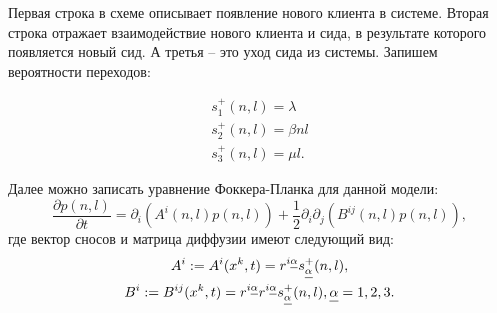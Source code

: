 \documentclass[floatfix,
showkeys,
twocolumn, nofootinbib, superscriptaddress, ]{revtex4-1}
\newcommand{\crd}[1]{\underline{\vphantom{j}{#1}}}
\begin{document}
  Первая строка в схеме описывает появление нового клиента в
  системе. Вторая строка отражает взаимодействие нового клиента и
  сида, в результате которого появляется новый сид. А третья – это
  уход сида из системы.
  Запишем вероятности переходов:

\begin{equation} 
  \label{ft:2}
  \begin{gathered}
    s^{+}_1 (n,l) = \lambda \\
    s^{+}_2 (n,l) = \beta nl \\
    s^{+}_3 (n,l) = \mu l.
  \end{gathered}
\end{equation}

  Далее можно записать уравнение Фоккера-Планка для данной модели:
\begin{equation}
  \label{ft:3} 
  \frac{\partial p(n,l)}{\partial t} = {\partial_i}
  (A^i(n,l) p(n,l)) + \frac{1}{2} {\partial_i \partial_j} (B^{ij}(n,l)
  p(n,l)),
\end{equation}
  где вектор сносов и матрица диффузии имеют следующий вид:
\begin{equation}
  \begin{gathered}
    A^i: = A^i(x^k,t)= r^{i\crd{\alpha}}s^+_{\crd{\alpha}} (n,l) ,\\
    B^i:= B^{ij}(x^k,t) = r^{i\crd{\alpha}}r^{i\crd{\alpha}}
    s^+_{\crd{\alpha}} (n,l), \crd{\alpha}=1,2,3.
  \end{gathered}
\end{equation}
\end{document}
